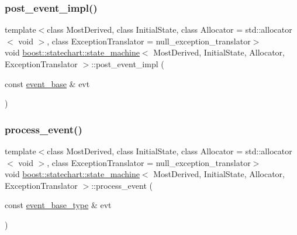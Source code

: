 \subsubsection{\texorpdfstring{post\+\_\+event\+\_\+impl()}{post\_event\_impl()}\hspace{0.1cm}{\footnotesize\ttfamily [2/2]}}
{\footnotesize\ttfamily template$<$class Most\+Derived, class Initial\+State, class Allocator = std\+::allocator$<$ void $>$, class Exception\+Translator = null\+\_\+exception\+\_\+translator$>$ \\
void \mbox{\hyperlink{classboost_1_1statechart_1_1state__machine}{boost\+::statechart\+::state\+\_\+machine}}$<$ Most\+Derived, Initial\+State, Allocator, Exception\+Translator $>$\+::post\+\_\+event\+\_\+impl (\begin{DoxyParamCaption}\item[{const \mbox{\hyperlink{classboost_1_1statechart_1_1event__base}{event\+\_\+base}} \&}]{evt }\end{DoxyParamCaption})\hspace{0.3cm}{\ttfamily [inline]}}

\mbox{\label{classboost_1_1statechart_1_1state__machine_a78598d4982f6b85e83358652eb1c3d6e}} 
\subsubsection{\texorpdfstring{process\+\_\+event()}{process\_event()}}
{\footnotesize\ttfamily template$<$class Most\+Derived, class Initial\+State, class Allocator = std\+::allocator$<$ void $>$, class Exception\+Translator = null\+\_\+exception\+\_\+translator$>$ \\
void \mbox{\hyperlink{classboost_1_1statechart_1_1state__machine}{boost\+::statechart\+::state\+\_\+machine}}$<$ Most\+Derived, Initial\+State, Allocator, Exception\+Translator $>$\+::process\+\_\+event (\begin{DoxyParamCaption}\item[{const \mbox{\hyperlink{classboost_1_1statechart_1_1state__machine_adb0e98d6d780a0977209fa7389b20bcd}{event\+\_\+base\+\_\+type}} \&}]{evt }\end{DoxyParamCaption})\hspace{0.3cm}{\ttfamily [inline]}}

